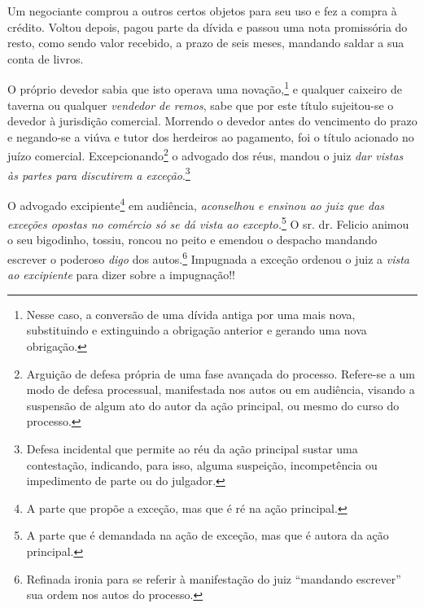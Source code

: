 {Um negociante comprou a outros certos objetos para seu uso e fez a
compra à crédito. Voltou depois, pagou parte da dívida e passou uma nota
promissória do resto, como sendo valor recebido, a prazo de seis meses,
mandando saldar a sua conta de livros.

O próprio devedor sabia que isto operava uma novação,\footnote{ Nesse
  caso, a conversão de uma dívida antiga por uma mais nova, substituindo
  e extinguindo a obrigação anterior e gerando uma nova obrigação.} e
qualquer caixeiro de taverna ou qualquer \emph{vendedor de remos}, sabe
que por este título sujeitou-se o devedor à jurisdição comercial.
Morrendo o devedor antes do vencimento do prazo e negando-se a viúva e
tutor dos herdeiros ao pagamento, foi o título acionado no juízo
comercial. Excepcionando\footnote{ Arguição de defesa própria de uma
  fase avançada do processo. Refere-se a um modo de defesa processual,
  manifestada nos autos ou em audiência, visando a suspensão de algum
  ato do autor da ação principal, ou mesmo do curso do processo.} o
advogado dos réus, mandou o juiz \emph{dar vistas às partes para
discutirem a exceção}.\footnote{ Defesa incidental que permite ao réu
  da ação principal sustar uma contestação, indicando, para isso, alguma
  suspeição, incompetência ou impedimento de parte ou do julgador.}

O advogado excipiente\footnote{ A parte que propõe a exceção, mas que é
  ré na ação principal.} em audiência, \emph{aconselhou e ensinou ao
juiz que das exceções opostas no comércio só se dá vista ao
excepto.}\footnote{ A parte que é demandada na ação de exceção, mas que
  é autora da ação principal.} O sr. dr. Felicio animou o seu bigodinho,
tossiu, roncou no peito e emendou o despacho mandando escrever o
poderoso \emph{digo} dos autos.\footnote{ Refinada ironia para se
  referir à manifestação do juiz ``mandando escrever'' sua ordem nos autos
  do processo.} Impugnada a exceção ordenou o juiz a \emph{vista ao
excipiente} para dizer sobre a impugnação!!

}
